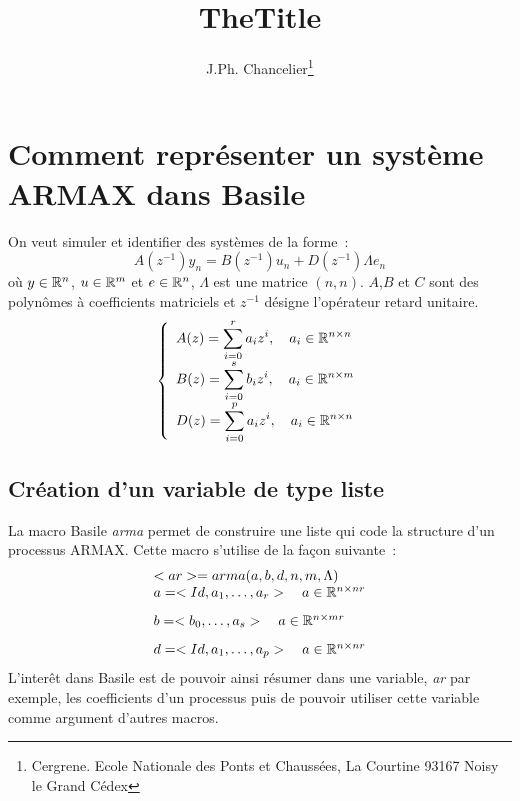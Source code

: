              \textheight=660pt 
             \textwidth=15cm
             \topmargin=-27pt 
             \oddsidemargin=0.7cm
             \evensidemargin=0.7cm
             \marginparwidth=60pt
             \title{TheTitle} 
             \author{J.Ph. Chancelier\thanks{Cergrene. Ecole Nationale des Ponts et Chauss\'ees, La Courtine  93167 Noisy le Grand C\'{e}dex }}
	
\maketitle
\def\ident{\mbox{Id}}
\def\R{{\Bbb R}}
\def\I{{\Bbb I}}
 
\def\cmarg{\hspace{1cm}}
\section{Comment repr\'esenter un syst\`eme ARMAX dans Basile}

On veut simuler et identifier des syst\`emes de la forme~:
\begin{equation}
	A(z^{-1}) y_{n}= B(z^{-1})u_{n} +  D(z^{-1}) \Lambda e_{n}
	\label{equara}
\end{equation}
o\`u $y\in \R^n$, $u\in \R^m$ et $e\in \R^n$, $\Lambda$ est une matrice $(n,n)$. $A$,$B$ et $C$ sont des polyn\^omes \`a coefficients matriciels et $z^{-1}$
 d\'esigne l'op\'erateur retard unitaire. 
\begin{equation}
	\left\{
	\begin{array}{l}
	{\displaystyle A(z)= \sum_{i=0}^r a_{i} z^i, \quad a_{i} \in \R^{n\times n}}\\[3mm]
	{\displaystyle B(z)= \sum_{i=0}^s b_{i} z^i, \quad a_{i} \in \R^{n\times m}}\\[3mm]
	{\displaystyle D(z)= \sum_{i=0}^p a_{i} z^i, \quad a_{i} \in \R^{n\times n}}\\[3mm]
	\end{array} \right.
\end{equation}

\subsection{Cr\'eation d'un variable de type liste}
La macro Basile {\em arma} permet de construire une liste qui code la structure d'un processus ARMAX. Cette macro s'utilise de la fa\c{c}on suivante~:
\begin{equation}
\begin{array}{l}
	<ar>=arma(a,b,d,n,m,\Lambda)\\
	a=<Id,a_{1},\ldots,a_{r}> \quad a \in \R^{n\times n r}\\[3mm]
	b=<b_{0},\ldots,a_{s}> \quad a \in  \R^{n\times m r }\\[3mm]
	d=<Id,a_{1},\ldots,a_{p}> \quad a \in \R^{n\times n r}
\end{array}
\end{equation}
L'inter\^et dans Basile est de pouvoir ainsi r\'esumer dans une variable, {\em ar} par exemple, les coefficients d'un processus puis de pouvoir utiliser 
cette variable comme argument d'autres macros.
